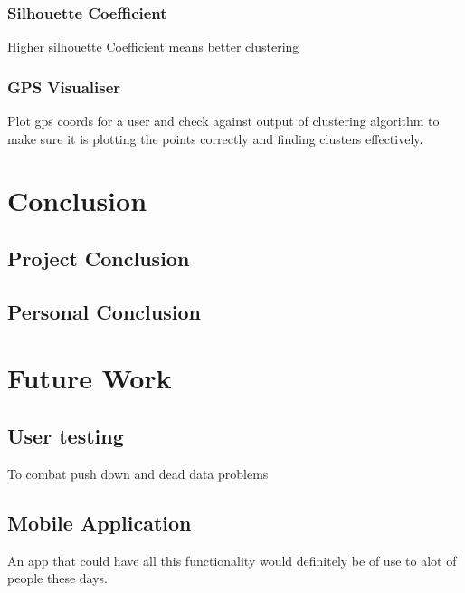 \documentclass[12pt]{article}
\begin{document}
		\subsubsection{Silhouette Coefficient}
			Higher silhouette Coefficient means better clustering
		\subsubsection{GPS Visualiser}
			Plot gps coords for a user and check against output of clustering algorithm to make sure it is plotting the points correctly and finding clusters effectively.	
\pagebreak

\section{Conclusion}
	\subsection{Project Conclusion}
	\subsection{Personal Conclusion}
	
\pagebreak
\section{Future Work}
	
	\subsection{User testing}
	To combat push down and dead data problems
	
	\subsection{Mobile Application}
		An app that could have all this functionality would definitely be of use to alot of people these days.



\end{document}
